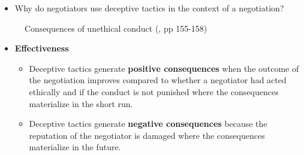 \documentclass[
  ignorenonframetext,
]{beamer}
\begin{document}
\begin{frame}{}
\label{section-8}
\begin{itemize}
\item
  Why do negotiators use deceptive tactics in the context of a
  negotiation?

\end{itemize}
\end{frame}

\begin{frame}{}
\label{section-9}
\begin{figure}


\caption{\label{fig-consequences-of-unethical-conduct}Consequences of
unethical conduct (, pp 155-158)}

\end{figure}%
\end{frame}

\begin{frame}{}
\label{section-10}
\begin{itemize}
\item
  \textbf{Effectiveness}

  \begin{itemize}
  \item
    Deceptive tactics generate \textbf{positive consequences} when the
    outcome of the negotiation improves compared to whether a negotiator
    had acted ethically and if the conduct is not punished where the
    consequences materialize in the short run.
  \item
    Deceptive tactics generate \textbf{negative consequences} because
    the reputation of the negotiator is damaged where the consequences
    materialize in the future.
  \end{itemize}
\end{itemize}
\end{frame}
\end{document}
